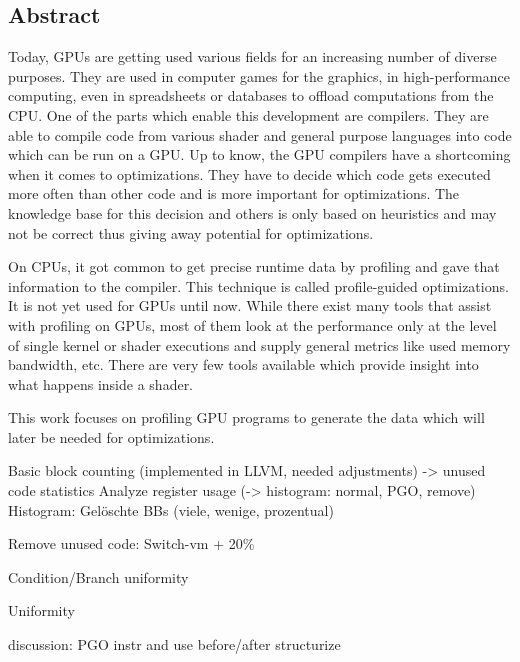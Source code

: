 \newpage
\vspace*{3.5cm}
\begin{center}
\begin{minipage}{12.5cm}
\section*{Abstract}
Today, GPUs are getting used various fields for an increasing number of diverse purposes. They are used in computer games for the graphics, in high-performance computing, even in spreadsheets or databases to offload computations from the CPU.
One of the parts which enable this development are compilers. They are able to compile code from various shader and general purpose languages into code which can be run on a GPU.
Up to know, the GPU compilers have a shortcoming when it comes to optimizations. They have to decide which code gets executed more often than other code and is more important for optimizations.
The knowledge base for this decision and others is only based on heuristics and may not be correct thus giving away potential for optimizations.

On CPUs, it got common to get precise runtime data by profiling and gave that information to the compiler. This technique is called profile-guided optimizations. It is not yet used for GPUs until now.
While there exist many tools that assist with profiling on GPUs, most of them look at the performance only at the level of single kernel or shader executions and supply general metrics like used memory bandwidth, etc.
There are very few tools available which provide insight into what happens inside a shader.

This work focuses on profiling GPU programs to generate the data which will later be needed for optimizations.

Basic block counting (implemented in LLVM, needed adjustments)
-> unused code statistics
Analyze register usage (-> histogram: normal, PGO, remove)
Histogram: Gelöschte BBs (viele, wenige, prozentual)

Remove unused code: Switch-vm + 20\%

Condition/Branch uniformity

Uniformity

discussion: PGO instr and use before/after structurize

\end{minipage}
\end{center}



